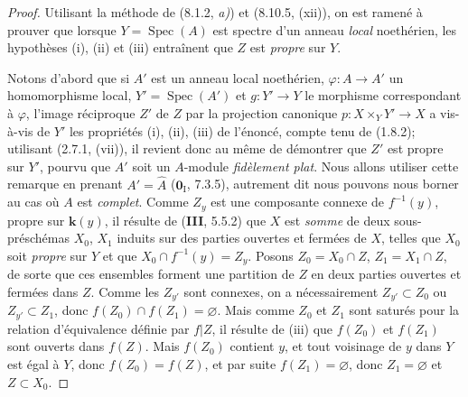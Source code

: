 \begin{proof}
Utilisant la méthode de (8.1.2, \emph{a)}) et (8.10.5, (xii)), on est ramené à prouver que lorsque $Y=\operatorname{Spec}(A)$ est spectre d'un anneau \emph{local} noethérien, les hypothèses (i), (ii) et (iii) entraînent que $Z$ est \emph{propre} sur $Y$.

Notons d'abord que si $A'$ est un anneau local noethérien, $\varphi:A\to A'$ un homomorphisme local, $Y'=\operatorname{Spec}(A')$ et $g:Y'\to Y$ le morphisme correspondant à $\varphi$, l'image réciproque $Z'$ de $Z$ par la projection canonique $p:X\times_Y Y'\to X$ a vis-à-vis de $Y'$ les propriétés (i), (ii), (iii) de l'énoncé, compte tenu de (1.8.2); utilisant (2.7.1, (vii)), il revient donc au même de démontrer que $Z'$ est propre sur $Y'$, pourvu que $A'$ soit un $A$-module \emph{fidèlement plat}. Nous allons utiliser cette remarque en prenant $A'=\widehat A$ ($\mathbf{0}_{\mathrm{I}}$, 7.3.5), autrement dit nous pouvons nous borner au cas où $A$ est \emph{complet}. Comme $Z_y$ est une composante connexe de $f^{-1}(y)$, propre sur $\boldsymbol{k}(y)$, il résulte de (\textbf{III}, 5.5.2) que $X$ est \emph{somme} de deux sous-préschémas $X_0$, $X_1$ induits sur des parties ouvertes et fermées de $X$, telles que $X_0$ soit \emph{propre} sur $Y$ et que $X_0\cap f^{-1}(y)=Z_y$. Posons $Z_0=X_0\cap Z$, $Z_1=X_1\cap Z$, de sorte que ces ensembles forment une partition de $Z$ en deux parties ouvertes et fermées dans $Z$. Comme les $Z_{y'}$ sont connexes, on a nécessairement $Z_{y'}\subset Z_0$ ou $Z_{y'}\subset Z_1$, donc $f(Z_0)\cap f(Z_1)=\varnothing$. Mais comme $Z_0$ et $Z_1$ sont saturés pour la relation d'équivalence définie par $f|Z$, il résulte de (iii) que $f(Z_0)$ et $f(Z_1)$ sont ouverts dans $f(Z)$. Mais $f(Z_0)$ contient $y$, et tout voisinage de $y$ dans $Y$ est égal à $Y$, donc $f(Z_0)=f(Z)$, et par suite $f(Z_1)=\varnothing$, donc $Z_1=\varnothing$ et $Z\subset X_0$.


\end{proof}
